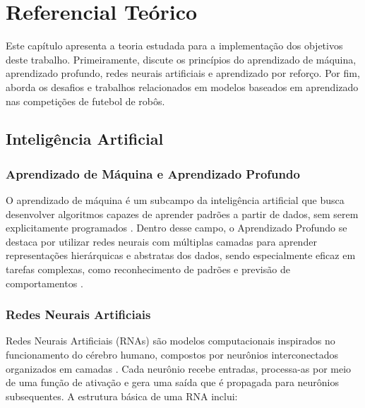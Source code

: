 \chapter[Referencial Teórico]{Referencial Teórico}

Este capítulo apresenta a teoria estudada para a implementação dos objetivos deste trabalho. Primeiramente, discute os princípios do aprendizado de máquina, aprendizado profundo, redes neurais artificiais e aprendizado por reforço. Por fim, aborda os desafios e trabalhos relacionados em modelos baseados em aprendizado nas competições de futebol de robôs.

\section{Inteligência Artificial}

\subsection{Aprendizado de Máquina e Aprendizado Profundo}

O aprendizado de máquina é um subcampo da inteligência artificial que busca desenvolver algoritmos capazes de aprender padrões a partir de dados, sem serem explicitamente programados \cite{goodfellow2016deep}. Dentro desse campo, o Aprendizado Profundo se destaca por utilizar redes neurais com múltiplas camadas para aprender representações hierárquicas e abstratas dos dados, sendo especialmente eficaz em tarefas complexas, como reconhecimento de padrões e previsão de comportamentos \cite{lecun2015deep}.


\subsection{Redes Neurais Artificiais}

Redes Neurais Artificiais (RNAs) são modelos computacionais inspirados no funcionamento do cérebro humano, compostos por neurônios interconectados organizados em camadas \cite{haykin2007redes}. Cada neurônio recebe entradas, processa-as por meio de uma função de ativação e gera uma saída que é propagada para neurônios subsequentes. A estrutura básica de uma RNA inclui:

